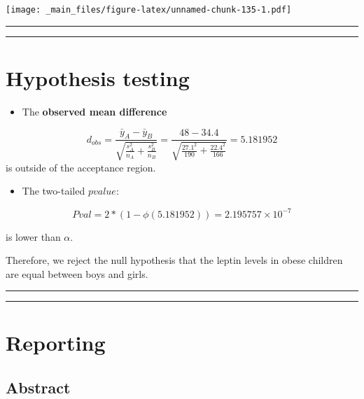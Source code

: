 \documentclass[
]{book}
\providecommand{\tightlist}{%
  \setlength{\itemsep}{0pt}\setlength{\parskip}{0pt}}
\begin{document}
\texttt{[image: \_main\_files/figure-latex/unnamed-chunk-135-1.pdf]}

\begin{center}\rule{0.5\linewidth}{0.5pt}\end{center}

\begin{center}\rule{0.5\linewidth}{0.5pt}\end{center}

\hypertarget{hypothesis-testing-1}{%
\section{Hypothesis testing}\label{hypothesis-testing-1}}

\begin{itemize}
\tightlist
\item
  The \textbf{observed mean difference}
\end{itemize}

\[d_{obs}=\frac{\bar{y}_A-\bar{y}_B }{\sqrt{\frac{s^2_A}{n_A}+\frac{s^2_B}{n_B}}}=\frac{48-34.4}{\sqrt{\frac{27.1^2}{190}+\frac{22.4^2}{166}}}=5.181952\]
is outside of the acceptance region.

\begin{itemize}
\tightlist
\item
  The two-tailed \(pvalue\):
\end{itemize}

\[Pval=2*(1-\phi(5.181952))=2.195757 \times 10^{-7}\]

is lower than \(\alpha\).

Therefore, we reject the null hypothesis that the leptin levels in obese children are equal between boys and girls.

\begin{center}\rule{0.5\linewidth}{0.5pt}\end{center}

\begin{center}\rule{0.5\linewidth}{0.5pt}\end{center}

\hypertarget{reporting}{%
\section{Reporting}\label{reporting}}

\hypertarget{abstract}{%
\subsection{Abstract}\label{abstract}}
\end{document}
